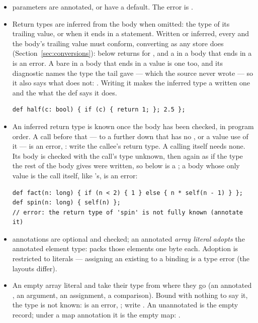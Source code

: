 \begin{itemize}[nosep]
\item {} parameters are annotated, or have a default.
  The error is .
\item Return types are inferred from the body when omitted: the type of
  its trailing value, or  when it ends in a statement. Written or
  inferred, every  and the body's trailing value must conform,
  converting as any store does (Section~\ref{sec:conversions}): 
  below returns  for , and a  in a body
  that ends in a  is an error. A bare  in a body
  that ends in a value is one too, and its diagnostic names the type the
  tail gave --- which the source never wrote --- so it also says what does
  not: . Writing it makes
  the inferred type a written one and the  what the def says
  it does.

\begin{lstlisting}
def half(c: bool) { if (c) { return 1; }; 2.5 };
\end{lstlisting}
\item An inferred return type is known once the body has been checked,
  in program order. A call before that --- to a  further down
  that has no \ic{->}, or a value use of it --- is an error,
  : write
  the callee's return type. A  calling itself needs none. Its body
  is checked with the call's type unknown, then again as if the type
  the rest of the body gives were written, so  below is a
  ; a body whose only value is the call itself, like
  's, is an error:

\begin{lstlisting}
def fact(n: long) { if (n < 2) { 1 } else { n * self(n - 1) } };
def spin(n: long) { self(n) };
// error: the return type of 'spin' is not fully known (annotate it)
\end{lstlisting}
\item {} annotations are optional and checked; an annotated
  \emph{array literal} \emph{adopts} the annotated element type:
   packs those elements one byte each.
  Adoption is restricted to literals --- assigning an existing
  \ic{[long]} to a \ic{[byte]} binding is a type error (the layouts
  differ).
\item An empty array literal \ic{[]} and  take their type from
  where they go (an annotated , an argument, an assignment, a
  comparison). Bound with nothing to say it, the type is not known:
   is an error, ; write . An unannotated
  \ic{\{\}} is the empty record; under a map annotation it is the empty
  map: .
\end{itemize}


